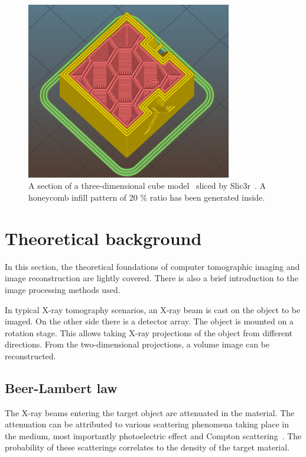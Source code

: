 \documentclass[a4paper,twoside,12pt]{article}
\begin{document}
\begin{figure}
    \centering
    \includegraphics[width=0.8\textwidth]{images/cube_slic3r.png}
    \caption{A section of a three-dimensional cube model~\cite{testcube} sliced by Slic3r~\cite{slic3r}. A honeycomb infill pattern of 20 \% ratio has been generated inside.}
    \label{fig:honeycomb}
\end{figure}

\section{Theoretical background}
In this section, the theoretical foundations of computer tomographic imaging and image reconstruction are lightly covered. There is also a brief introduction to the image processing methods used.

In typical X-ray tomography scenarios, an X-ray beam is cast on the object to be imaged. On the other side there is a detector array. The object is mounted on a rotation stage. This allows taking X-ray projections of the object from different directions. From the two-dimensional projections, a volume image can be reconstructed.

\subsection{Beer-Lambert law}
The X-ray beams entering the target object are attenuated in the material. The attenuation can be attributed to various scattering phenomena taking place in the medium, most importantly photoelectric effect and Compton scattering~\cite{lectures}. The probability of these scatterings correlates to the density of the target material.
\end{document}
